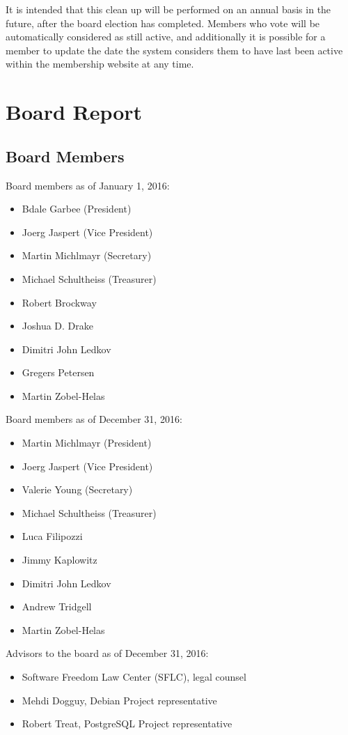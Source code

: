 \documentclass[letterpaper]{report}
\begin{document}
It is intended that this clean up will be performed on an annual basis in the future, after the board election has completed. Members who vote will be automatically considered as still active, and additionally it is possible for a member to update the date the system considers them to have last been active within the membership website at any time.

\chapter{Board Report}
\section{Board Members}

Board members as of January 1, 2016:

\begin{itemize}
\item Bdale Garbee (President)
\item Joerg Jaspert (Vice President)
\item Martin Michlmayr (Secretary)
\item Michael Schultheiss (Treasurer)
\item Robert Brockway
\item Joshua D. Drake
\item Dimitri John Ledkov
\item Gregers Petersen
\item Martin Zobel-Helas
\end{itemize}

Board members as of December 31, 2016:

\begin{itemize}
\item Martin Michlmayr (President)
\item Joerg Jaspert (Vice President)
\item Valerie Young (Secretary)
\item Michael Schultheiss (Treasurer)
\item Luca Filipozzi
\item Jimmy Kaplowitz
\item Dimitri John Ledkov
\item Andrew Tridgell
\item Martin Zobel-Helas
\end{itemize}

Advisors to the board as of December 31, 2016:

\begin{itemize}
\item Software Freedom Law Center (SFLC), legal counsel
\item Mehdi Dogguy, Debian Project representative
\item Robert Treat, PostgreSQL Project representative
\end{itemize}
\end{document}
